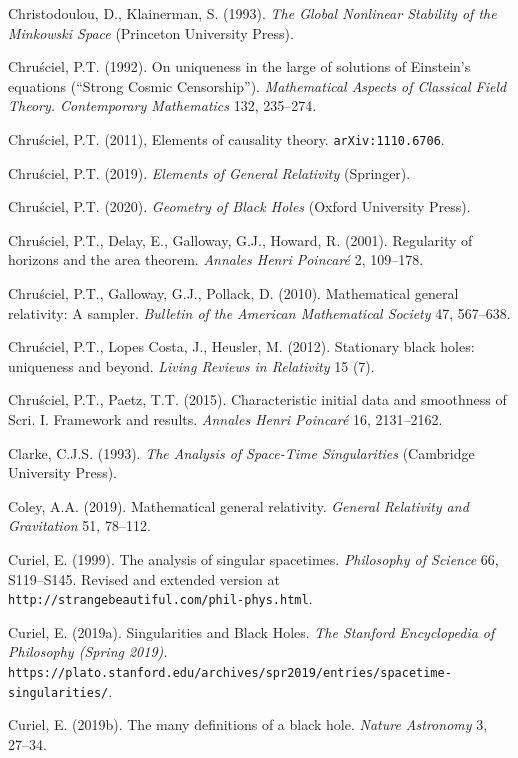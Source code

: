 \documentclass[11pt,a4paper]{article}
\begin{document}
\begin{small}
\begin{thebibliography}{99}
 \item[] Christodoulou, D., Klainerman, S. (1993). \emph{The Global Nonlinear Stability of the Minkowski Space}
(Princeton University Press). 
 \item[] Chru\'{s}ciel, P.T.  (1992). On uniqueness in the large of solutions of Einstein's equations (``Strong Cosmic Censorship''). \emph{Mathematical Aspects of Classical Field Theory. Contemporary Mathematics} 132, 235--274.
 \item[]  Chru\'{s}ciel, P.T. (2011), Elements of causality theory. \texttt{arXiv:1110.6706}.
\item[]  Chru\'{s}ciel, P.T. (2019). \emph{Elements of General Relativity} (Springer). 
\item[]  Chru\'{s}ciel, P.T. (2020). \emph{Geometry of Black Holes} (Oxford University Press). 
\item[]   Chru\'{s}ciel, P.T., Delay, E., Galloway,  G.J., Howard, R. (2001). 
Regularity of horizons and the area theorem.
\emph{Annales Henri Poincar\'{e}} 2, 109--178. 
\item[]   Chru\'{s}ciel, P.T., Galloway, G.J.,  Pollack, D. (2010).
Mathematical general relativity: A sampler. \emph{Bulletin of the American Mathematical Society} 47, 567--638.
\item[] Chru\'{s}ciel, P.T.,  Lopes Costa, J.,  Heusler, M. (2012).
Stationary black holes: uniqueness and beyond. \emph{Living Reviews in Relativity} 15 (7).
\item[]  Chru\'{s}ciel, P.T., Paetz, T.T. (2015). Characteristic initial data and smoothness of Scri. I. Framework and results.
\emph{ Annales Henri Poincar\'{e}} 16, 2131--2162.
\item[]   Clarke,  C.J.S. (1993). \emph{The Analysis of Space-Time Singularities} (Cambridge University Press).
\item[] Coley, A.A. (2019). Mathematical general relativity. \emph{General Relativity and Gravitation} 51, 78--112.
\item[] Curiel, E. (1999).  The analysis of singular spacetimes. \emph{Philosophy of Science} 66, S119--S145. 
Revised and extended version at \verb#http://strangebeautiful.com/phil-phys.html#.
\item[] Curiel, E. (2019a). Singularities and Black Holes. \emph{The Stanford Encyclopedia of Philosophy (Spring 2019).}\\ \verb#https://plato.stanford.edu/archives/spr2019/entries/spacetime-singularities/#.
\item[] Curiel, E. (2019b). The many definitions of a black hole. \emph{Nature Astronomy} 3, 27--34.

\end{thebibliography}
\end{small}
\end{document}
